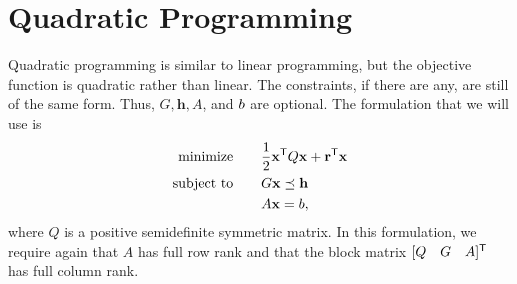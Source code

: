 \chapter{Quadratic Programming}

Quadratic programming is similar to linear programming, but the objective function is quadratic rather than linear.
The constraints, if there are any, are still of the same form.
Thus, $G, \mathbf{h}, A$, and $b$ are optional.
The formulation that we will use is
\begin{align*}
\mbox{minimize}\qquad &\frac{1}{2}\mathbf{x}^{\mathsf T} Q\mathbf{x} + \mathbf{r}^{\mathsf T} \mathbf{x} \\
\mbox{subject to}\qquad &G\mathbf{x} \preceq \mathbf{h}\\
 &A\mathbf{x} = b,
\end{align*}
where $Q$ is a positive semidefinite symmetric matrix.
In this formulation, we require again that $A$ has full row rank and that the block matrix
$[Q \quad G \quad A]^{\mathsf T} $ has full column rank.

